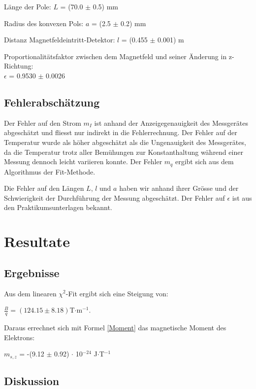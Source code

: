 \documentclass[a4paper,parskip,11pt, DIV12]{scrreprt}
\begin{document}
Länge der Pole:
$L$ = (70.0 $\pm$ 0.5) mm

Radius des konvexen Pols:
$a$ = (2.5 $\pm$ 0.2) mm

Distanz Magnetfeldeintritt-Detektor:
$l$ = (0.455 $\pm$ 0.001) m

Proportionalitätsfaktor zwischen dem Magnetfeld und seiner Änderung in z-Richtung:\\
$\epsilon$ = 0.9530 $\pm$ 0.0026


\section{Fehlerabschätzung}
Der Fehler auf den Strom $m_I$ ist anhand der Anzeigegenauigkeit des Messgerätes abgeschätzt und fliesst nur indirekt in die Fehlerrechnung. Der Fehler auf der Temperatur wurde als höher abgeschätzt als die Ungenauigkeit des Messgerätes, da die Temperatur trotz aller Bemühungen zur Konstanthaltung während einer Messung dennoch leicht variieren konnte. Der Fehler $m_q$ ergibt sich aus dem Algorithmus der Fit-Methode.

Die Fehler auf den Längen $L$, $l$ und $a$ haben wir anhand ihrer Grösse und der Schwierigkeit der Durchführung der Messung abgeschätzt. Der Fehler auf $\epsilon$ ist aus den Praktikumsunterlagen bekannt.
\clearpage

\chapter{Resultate}

\section{Ergebnisse}

Aus dem linearen $\chi^2$-Fit ergibt sich eine Steigung von:

$\frac{B}{q} = (124.15 \pm 8.18) $T$ \cdot $m$^{-1}$.

Daraus errechnet sich mit Formel \ref{Moment} das magnetische Moment des Elektrons:
\begin{center}
\begin{large}
$m_{s,z}$ = -(9.12 $\pm$ 0.92) $\cdot$ 10$^{-24}$ J$\cdot$T$^{-1}$
\end{large}
\end{center}



\section{Diskussion}
\end{document}
